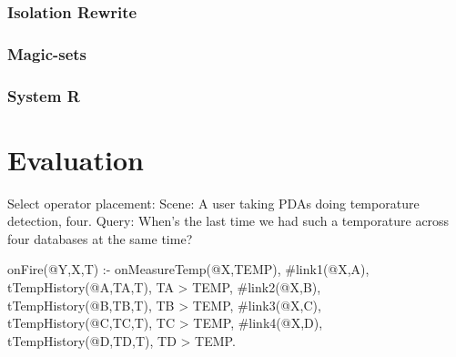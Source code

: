 \documentclass{vldb}
\newtheorem{theorem}{Theorem}[section]
\begin{document}
\subsubsection{Isolation Rewrite}


\subsubsection{Magic-sets}

\subsubsection{System R}

\section{Evaluation}
Select operator placement:
Scene: A user taking PDAs doing temporature detection, four.
Query: When's the last time we had such a temporature across four databases at the same time?

onFire(@Y,X,T) :- onMeasureTemp(@X,TEMP), \#link1(@X,A), tTempHistory(@A,TA,T), TA > TEMP,
 				          \#link2(@X,B), tTempHistory(@B,TB,T), TB > TEMP,
					  \#link3(@X,C), tTempHistory(@C,TC,T), TC > TEMP,
				          \#link4(@X,D), tTempHistory(@D,TD,T), TD > TEMP.




\end{document}
